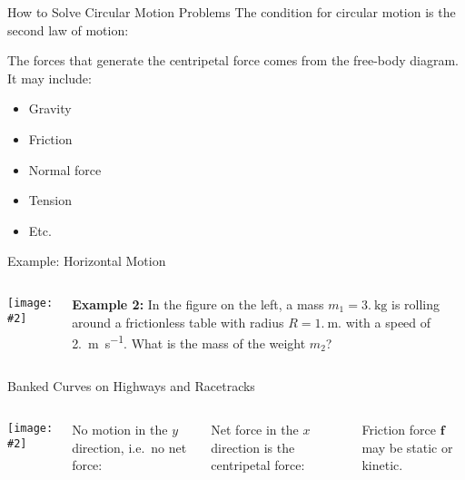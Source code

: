 \documentclass[12pt,compress,aspectratio=169]{beamer}
\newcommand{\pic}[2]{\texttt{[image: \#2]}}
\newcommand{\eq}[2]{\vspace{#1}{\Large\begin{displaymath}#2\end{displaymath}}}
\begin{document}
\begin{frame}{How to Solve Circular Motion Problems}
  The condition for circular motion is the second law of motion:

  \eq{-.2in}{
    \bm{F}_c=\sum\bm{F}=m\bm{a}_c
  }
  
  The forces that generate the centripetal force comes from the free-body
  diagram. It may include:
  \begin{itemize}
  \item Gravity
  \item Friction
  \item Normal force
  \item Tension
  \item Etc.
  \end{itemize}
\end{frame}



\begin{frame}{Example: Horizontal Motion}
  \begin{columns}
    \pic{1}{puck-on-table.png}
    
    \textbf{Example 2:} In the figure on the left, a mass
    $m_1=\SI{3.}{\kilo\gram}$ is rolling around a frictionless table with
    radius $R=\SI{1.}{\metre}$. with a speed of \SI{2.}{\metre\per\second}.
    What is the mass of the weight $m_2$?
  \end{columns}
\end{frame}



\begin{frame}{Banked Curves on Highways and Racetracks}
  \begin{columns}
    \centering
    \pic{.8}{banked-turn-acceleration.png}\\

    No motion in the $y$ direction, i.e.\ no net force:

    \eq{-.35in}{
      \sum F_y=N\cos\theta-f\sin\theta-w=0
    }

    Net force in the $x$ direction is the centripetal force:

    \eq{-.35in}{
      \sum F_x=N\sin\theta +f\cos\theta = \frac{mv^2}{r}
    }

    Friction force $\bm{f}$ may be static or kinetic.
  \end{columns}
\end{frame}
\end{document}
